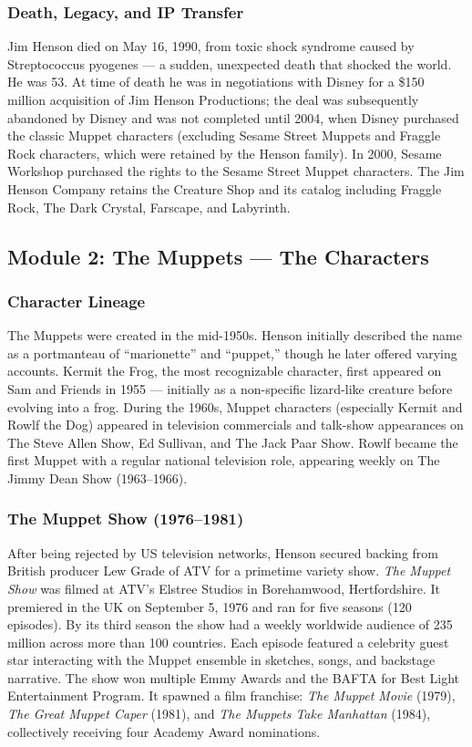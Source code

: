 \documentclass[11pt,letterpaper]{article}
\begin{document}
\subsubsection{Death, Legacy, and IP Transfer}

Jim Henson died on May 16, 1990, from toxic shock syndrome caused by Streptococcus pyogenes --- a sudden, unexpected death that shocked the world. He was 53. At time of death he was in negotiations with Disney for a \$150 million acquisition of Jim Henson Productions; the deal was subsequently abandoned by Disney and was not completed until 2004, when Disney purchased the classic Muppet characters (excluding Sesame Street Muppets and Fraggle Rock characters, which were retained by the Henson family). In 2000, Sesame Workshop purchased the rights to the Sesame Street Muppet characters. The Jim Henson Company retains the Creature Shop and its catalog including Fraggle Rock, The Dark Crystal, Farscape, and Labyrinth.

\subsection{Module 2: The Muppets --- The Characters}

\subsubsection{Character Lineage}

The Muppets were created in the mid-1950s. Henson initially described the name as a portmanteau of ``marionette'' and ``puppet,'' though he later offered varying accounts. Kermit the Frog, the most recognizable character, first appeared on Sam and Friends in 1955 --- initially as a non-specific lizard-like creature before evolving into a frog. During the 1960s, Muppet characters (especially Kermit and Rowlf the Dog) appeared in television commercials and talk-show appearances on The Steve Allen Show, Ed Sullivan, and The Jack Paar Show. Rowlf became the first Muppet with a regular national television role, appearing weekly on The Jimmy Dean Show (1963--1966).

\subsubsection{The Muppet Show (1976--1981)}

After being rejected by US television networks, Henson secured backing from British producer Lew Grade of ATV for a primetime variety show. \textit{The Muppet Show} was filmed at ATV's Elstree Studios in Borehamwood, Hertfordshire. It premiered in the UK on September 5, 1976 and ran for five seasons (120 episodes). By its third season the show had a weekly worldwide audience of 235 million across more than 100 countries. Each episode featured a celebrity guest star interacting with the Muppet ensemble in sketches, songs, and backstage narrative. The show won multiple Emmy Awards and the BAFTA for Best Light Entertainment Program. It spawned a film franchise: \textit{The Muppet Movie} (1979), \textit{The Great Muppet Caper} (1981), and \textit{The Muppets Take Manhattan} (1984), collectively receiving four Academy Award nominations.
\end{document}
